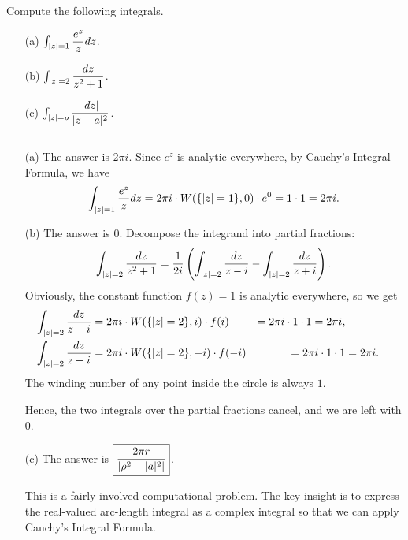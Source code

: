 \begin{exercise}
Compute the following integrals.
\begin{enumerate}
\item[(a)] $\int_{\lvert z \rvert=1}\dfrac{e^z}{z}dz$.
\item[(b)] $\int_{\lvert z \rvert=2} \dfrac{dz}{z^2+1}$.
\item[(c)] $\int_{\lvert z \rvert=\rho}\dfrac{\lvert dz \rvert}{\lvert z-a \rvert^2}$.
\end{enumerate}

\begin{sol}
$ $
\begin{enumerate}
\item[(a)] The answer is $\boxed{2\pi i}$. Since $e^z$ is analytic everywhere, by Cauchy's Integral Formula, we have $$\int_{\lvert z \rvert=1}\dfrac{e^z}{z}dz=2\pi i \cdot W(\{\lvert z \rvert=1\},0) \cdot e^0=1 \cdot 1=2\pi i.$$
\item[(b)] The answer is $\boxed{0}$. Decompose the integrand into partial fractions: $$\int_{\lvert z \rvert=2} \dfrac{dz}{z^2+1}=\dfrac{1}{2i}\left(\int_{\lvert z \rvert=2}\dfrac{dz}{z-i}-\int_{\lvert z \rvert=2}\dfrac{dz}{z+i}\right).$$ Obviously, the constant function $f(z)=1$ is analytic everywhere, so we get \begin{align*}
\int_{\lvert z \rvert=2}\dfrac{dz}{z-i} &= 2\pi i \cdot W(\{\lvert z \rvert=2\},i) \cdot f(i) &=2\pi i \cdot 1 \cdot 1=2\pi i,\\
\int_{\lvert z \rvert=2}\dfrac{dz}{z+i} &= 2\pi i \cdot W(\{\lvert z \rvert=2\},-i) \cdot f(-i) &=2\pi i \cdot 1 \cdot 1 &=2\pi i.
\end{align*}
The winding number of any point inside the circle is always $1$.

Hence, the two integrals over the partial fractions cancel, and we are left with $0$.
\item[(c)] The answer is $\boxed{\dfrac{2\pi r}{\lvert \rho^2-\lvert a \rvert^2 \rvert}}$.

This is a fairly involved computational problem. The key insight is to express the real-valued arc-length integral as a complex integral so that we can apply Cauchy's Integral Formula.


\end{enumerate}
\end{sol}
\end{exercise}
